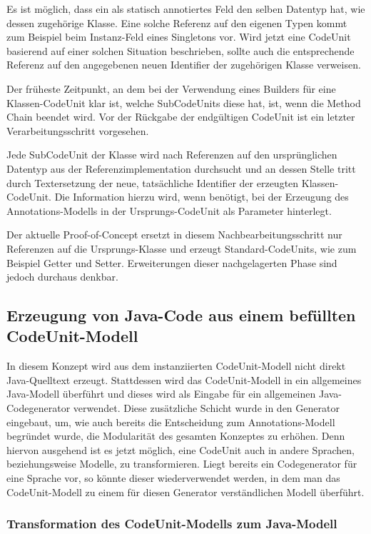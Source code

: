 \documentclass[12pt,oneside,a4paper,parskip]{scrbook}
\begin{document}
Es ist möglich, dass ein als statisch annotiertes Feld den selben Datentyp hat, wie dessen zugehörige Klasse. Eine solche Referenz auf den eigenen Typen kommt zum Beispiel beim Instanz-Feld eines Singletons vor. Wird jetzt eine CodeUnit basierend auf einer solchen Situation beschrieben, sollte auch die entsprechende Referenz auf den angegebenen neuen Identifier der zugehörigen Klasse verweisen.

Der früheste Zeitpunkt, an dem bei der Verwendung eines Builders für eine Klassen-CodeUnit klar ist, welche SubCodeUnits diese hat, ist, wenn die Method Chain beendet wird. Vor der Rückgabe der endgültigen CodeUnit ist ein letzter Verarbeitungsschritt vorgesehen.

Jede SubCodeUnit der Klasse wird nach Referenzen auf den ursprünglichen Datentyp aus der Referenzimplementation durchsucht und an dessen Stelle tritt durch Textersetzung der neue, tatsächliche Identifier der erzeugten Klassen-CodeUnit. Die Information hierzu wird, wenn benötigt, bei der Erzeugung des Annotations-Modells in der Ursprungs-CodeUnit als Parameter hinterlegt.

Der aktuelle Proof-of-Concept ersetzt in diesem Nachbearbeitungsschritt nur Referenzen auf die Ursprungs-Klasse und erzeugt Standard-CodeUnits, wie zum Beispiel Getter und Setter. Erweiterungen dieser nachgelagerten Phase sind jedoch durchaus denkbar.

\subsection{Erzeugung von Java-Code aus einem befüllten CodeUnit-Modell}

In diesem Konzept wird aus dem instanziierten CodeUnit-Modell nicht direkt Java-Quelltext erzeugt. Stattdessen wird das CodeUnit-Modell in ein allgemeines Java-Modell überführt und dieses wird als Eingabe für ein allgemeinen Java-Codegenerator verwendet. Diese zusätzliche Schicht wurde in den Generator eingebaut, um, wie auch bereits die Entscheidung zum Annotations-Modell begründet wurde, die Modularität des gesamten Konzeptes zu erhöhen. Denn hiervon ausgehend ist es jetzt möglich, eine CodeUnit auch in andere Sprachen, beziehungsweise Modelle, zu transformieren. Liegt bereits ein Codegenerator für eine Sprache vor, so könnte dieser wiederverwendet werden, in dem man das CodeUnit-Modell zu einem für diesen Generator verständlichen Modell überführt.

\subsubsection{Transformation des CodeUnit-Modells zum Java-Modell}
\end{document}
